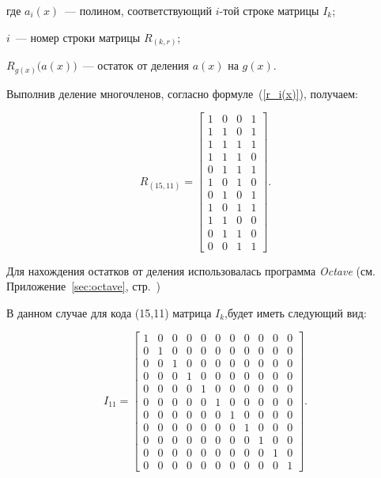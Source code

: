 \begin{ESKDexplanation}
\item[где ] $a_i(x)$~--- полином, соответствующий $i$-той строке
  матрицы $I_k$;
\item $i$~--- номер строки матрицы $R_{(k, r)}$;
\item $R_{g(x)}\bigl(a(x)\bigr)$~--- остаток от деления $a(x)$ на $g(x)$.
\end{ESKDexplanation}

Выполнив деление многочленов, согласно формуле~(\ref{r_i(x)}),
получаем:

\begin{equation*}
  R_{(15, 11)} =  \left[
    \begin{array}{cccc}
      1 & 0 & 0 & 1 \\
      1 & 1 & 0 & 1 \\
      1 & 1 & 1 & 1 \\
      1 & 1 & 1 & 0 \\
      0 & 1 & 1 & 1 \\
      1 & 0 & 1 & 0 \\
      0 & 1 & 0 & 1 \\
      1 & 0 & 1 & 1 \\
      1 & 1 & 0 & 0 \\
      0 & 1 & 1 & 0 \\
      0 & 0 & 1 & 1  
    \end{array}
  \right].
\end{equation*}

Для нахождения остатков от деления использовалась программа
\textit{Octave} (см. Приложение~\ref{sec:octave},
стр.~\pageref{page1})

В данном случае для кода (15,11) матрица $I_k$,будет иметь следующий
вид:

\begin{equation*}
  I_{11} =  \left[
    \begin{array}{cccccccccccc}
      1 & 0 & 0 & 0 & 0 & 0 & 0 & 0 & 0 & 0 & 0\\
      0 & 1 & 0 & 0 & 0 & 0 & 0 & 0 & 0 & 0 & 0\\
      0 & 0 & 1 & 0 & 0 & 0 & 0 & 0 & 0 & 0 & 0\\
      0 & 0 & 0 & 1 & 0 & 0 & 0 & 0 & 0 & 0 & 0\\
      0 & 0 & 0 & 0 & 1 & 0 & 0 & 0 & 0 & 0 & 0\\
      0 & 0 & 0 & 0 & 0 & 1 & 0 & 0 & 0 & 0 & 0\\
      0 & 0 & 0 & 0 & 0 & 0 & 1 & 0 & 0 & 0 & 0\\
      0 & 0 & 0 & 0 & 0 & 0 & 0 & 1 & 0 & 0 & 0\\
      0 & 0 & 0 & 0 & 0 & 0 & 0 & 0 & 1 & 0 & 0\\
      0 & 0 & 0 & 0 & 0 & 0 & 0 & 0 & 0 & 1 & 0\\
      0 & 0 & 0 & 0 & 0 & 0 & 0 & 0 & 0 & 0 & 1 
    \end{array}
  \right].
\end{equation*}

